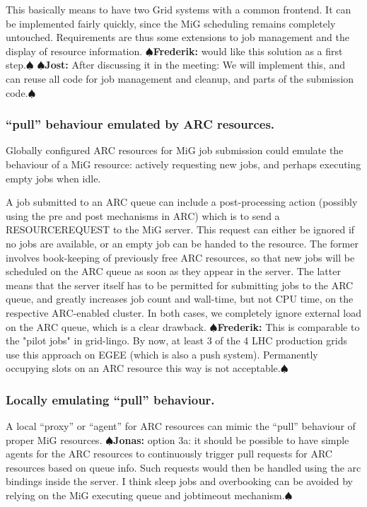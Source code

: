 \documentclass[11pt]{article}
\newcommand{\comm}[2]{{\scriptsize
    \(\spadesuit\){\bf #1: }{\rm \sf #2}\(\spadesuit\)}}
\newcommand{\jonas}[1]{\comm{Jonas}{#1}}
\newcommand{\jost}[1]{\comm{Jost}{#1}}
\newcommand{\frederik}[1]{\comm{Frederik}{#1}}
\begin{document}
    This basically means to have two Grid systems with a common
    frontend. It can be implemented fairly quickly, since the MiG
    scheduling remains completely untouched. Requirements are thus
    some extensions to job management and the display of resource
    information.  
%
\frederik{would like this solution as a first step.}  \jost{After
  discussing it in the meeting: We will implement this, and can reuse
  all code for job management and cleanup, and parts of the submission
  code.}

    
\subsubsection{``pull'' behaviour emulated by ARC resources.}
    Globally configured ARC resources for MiG job submission could
    emulate the behaviour of a MiG resource: actively requesting new
    jobs, and perhaps executing empty jobs when idle.

    A job submitted to an ARC queue can include a post-processing
    action (possibly using the pre and post mechanisms in ARC) which
    is to send a RESOURCEREQUEST to the MiG server. This request can
    either be ignored if no jobs are available, or an empty job can be
    handed to the resource. The former involves book-keeping of
    previously free ARC resources, so that new jobs will be scheduled
    on the ARC queue as soon as they appear in the server. The latter
    means that the server itself has to be permitted for submitting
    jobs to the ARC queue, and greatly increases job count and
    wall-time, but not CPU time, on the respective ARC-enabled
    cluster. In both cases, we completely ignore external load on the
    ARC queue, which is a clear drawback.
\frederik{This is comparable to the "pilot jobs" in grid-lingo. By
  now, at least 3 of the 4 LHC production grids use this approach on
  EGEE (which is also a push system). Permanently occupying slots on
  an ARC resource this way is not acceptable.}

\subsubsection{Locally emulating ``pull'' behaviour.}
 A local ``proxy'' or ``agent'' for ARC resources can mimic the ``pull''
    behaviour of proper MiG resources. 
%
\jonas{option 3a: it should be possible to have simple agents for the
  ARC resources to continuously trigger pull requests for ARC
  resources based on queue info. Such requests would then be handled
  using the arc bindings inside the server. I think sleep jobs and
  overbooking can be avoided by relying on the MiG executing queue and
  jobtimeout mechanism.}
\end{document}
